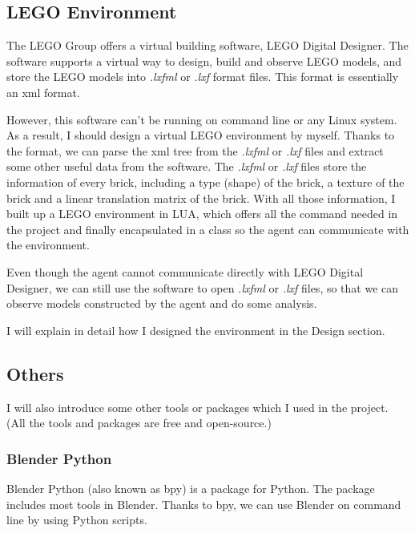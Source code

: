 \documentclass[a4paper]{article}
\begin{document}
            
            
        
        \subsection{LEGO Environment}
        
            The LEGO Group offers a virtual building software, LEGO Digital Designer\cite{ldd}. The software supports a virtual way to design, build and observe LEGO models, and store the LEGO models into \textit{.lxfml} or \textit{.lxf} format files. This format is essentially an xml format. 
            
            However, this software can't be running on command line or any Linux system. As a result, I should design a virtual LEGO environment by myself. Thanks to the format, we can parse the xml tree from the \textit{.lxfml} or \textit{.lxf} files and extract some other useful data from the software. The \textit{.lxfml} or \textit{.lxf} files store the information of every brick, including a type (shape) of the brick, a texture of the brick and a linear translation matrix of the brick. With all those information, I built up a LEGO environment in LUA, which offers all the command needed in the project and finally encapsulated in a class so the agent can communicate with the environment.
            
            Even though the agent cannot communicate directly with LEGO Digital Designer, we can still use the software to open \textit{.lxfml} or \textit{.lxf} files, so that we can observe models constructed by the agent and do some analysis. 
            
            I will explain in detail how I designed the environment in the Design section.
        
        \subsection{Others}
            I will also introduce some other tools or packages which I used in the project.
            (All the tools and packages are free and open-source.)
            
            \subsubsection{Blender Python}
                Blender Python (also known as bpy) is a package for Python. The package includes most tools in Blender. Thanks to bpy, we can use Blender on command line by using Python scripts. 
                
\end{document}
